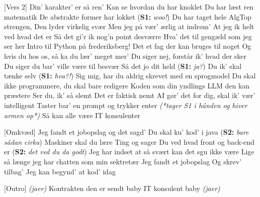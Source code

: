 \documentclass[a4paper,11pt]{article}
\begin{document}
\begin{song}
[Vers 2] Din’ karakter’ er så ren’ 
Kan se hvordan du har knoklet 
Du har læst ren matematik
De abstrakte former har lokket (\textbf{S1:} \textit{woo!})
Du har taget hele AlgTop strengen, 
Den lyder virkelig svær 
Men jeg på vær’ ærlig at indrøm’
At jeg ik helt ved hvad det er
Så det gi’r ik nog’n point desværre
Hva' det til gengæld som jeg ser her 
Intro til Python på frederiksberg!
Det et fag der kan bruges til noget 
Og hvis du hos os, så ka du lær’ meget mer’
Du siger nej, forstår ik' hvad der sker 
Du siger du bar' ville være til besvær 
Så det jo dit held (\textbf{S1:} \textit{ja?}) 
Du ik' skal tænke selv (\textbf{S1:} \textit{hva?!})
Sig mig, har du aldrig skrevet med en sprogmodel
Du skal ikke programmere, du skal bare redigere
Koden som din yndlings LLM den kan præstere 
Ser du, ik' så slemt
Det er faktisk nemt    
AI gør' det for dig, skal ik' vær' intelligent
Taster bar' en prompt og trykker enter
\textit{(*tager S1 i hånden og hiver armen op*)}
Så kan alle være IT konsulenter


[Omkvæd]
Jeg fandt et jobopslag 
og det sagd’ 
Du skal ku’ kod’ i java (\textbf{S2:} \textit{bare sådan cirka})
Maskiner skal du lære
Ting og sager
Du ved hvad front og back-end er 
(\textbf{S2:} \textit{det ved du da godt})
Jeg har indset at så svært kan det sgu ikke være 
Lige så længe jeg har chatten som min sektretær 
Jeg fandt et jobopslag
Og skrev’ tilbag’
Jeg kan begynd' at kod' idag

[Outro] \textit{(jaer)} 
Kontrakten den er sendt baby
IT konsulent baby 
\textit{(jaer)}
\end{song}
\end{document}
